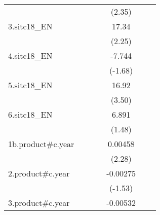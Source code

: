 {\begin{tabular}{l*{6}{c}}
                    &                     &                     &                     &      (2.35)         &                     &                     \\
[1em]
3.sitc18\_EN         &                     &                     &                     &       17.34\sym{*}  &                     &                     \\
                    &                     &                     &                     &      (2.25)         &                     &                     \\
[1em]
4.sitc18\_EN         &                     &                     &                     &      -7.744         &                     &                     \\
                    &                     &                     &                     &     (-1.68)         &                     &                     \\
[1em]
5.sitc18\_EN         &                     &                     &                     &       16.92\sym{***}&                     &                     \\
                    &                     &                     &                     &      (3.50)         &                     &                     \\
[1em]
6.sitc18\_EN         &                     &                     &                     &       6.891         &                     &                     \\
                    &                     &                     &                     &      (1.48)         &                     &                     \\
[1em]
1b.product#c.year   &                     &                     &                     &     0.00458\sym{*}  &                     &                     \\
                    &                     &                     &                     &      (2.28)         &                     &                     \\
[1em]
2.product#c.year    &                     &                     &                     &    -0.00275         &                     &                     \\
                    &                     &                     &                     &     (-1.53)         &                     &                     \\
[1em]
3.product#c.year    &                     &                     &                     &    -0.00532         &                     &                     \\

\end{tabular}}
